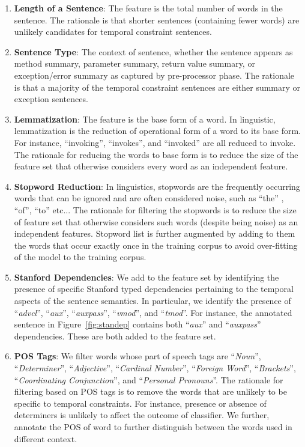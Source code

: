 \begin{enumerate}

	\item \textbf{Length of a Sentence}: The feature is the total number of words in  the sentence. The rationale is that shorter sentences (containing fewer words) are unlikely candidates for temporal constraint sentences. 

	\item \textbf{Sentence Type}: The context of sentence, whether the sentence appears as method summary, parameter summary, return value summary, or exception/error summary as captured by pre-processor phase. The rationale is that a majority of the temporal constraint sentences are either summary or exception sentences. 
	
	\item \textbf{Lemmatization}: The feature is the base form of a word. In linguistic, lemmatization is the reduction of operational form of a word to its base form. For instance, ``invoking'', ``invokes'', and ``invoked'' are all reduced to invoke. The rationale for reducing the words to base form is to reduce the size of the feature set that otherwise considers every word as an independent feature.  
	
	\item \textbf{Stopword Reduction}: In linguistics, stopwords are the frequently occurring words that can be ignored and are often considered noise, such as ``the'' , ``of'', ``to'' etc... The rationale for filtering the stopwords is to reduce the size of feature set that otherwise considers such words (despite being noise) as an independent features. Stopword list is further augmented by adding to them the words that occur exactly once in the training corpus to avoid over-fitting of the model to the training corpus.  
	
	\item \textbf{Stanford Dependencies}: We add to the feature set by identifying the presence of specific Stanford typed dependencies pertaining to the temporal aspects of the sentence semantics. In particular, we identify the presence of ``\textit{advcl}'', ``\textit{aux}'', ``\textit{auxpass}'', ``\textit{vmod}'', and ``\textit{tmod}''. For instance, the annotated sentence in Figure~\ref{fig:standep} contains both ``\textit{aux}'' and ``\textit{auxpass}'' dependencies. These are both added to the feature set.
	
	\item \textbf{POS Tags}: We filter words whose part of speech tags are ``\textit{Noun}'', ``\textit{Determiner}'', ``\textit{Adjective}'', ``\textit{Cardinal Number}'', ``\textit{Foreign Word}'', ``\textit{Brackets}'', ``\textit{Coordinating Conjunction}'', and ``\textit{Personal Pronouns}''. The rationale for filtering based on POS tags is to remove the words that are unlikely to be specific to temporal constraints. For instance, presence or absence of determiners is unlikely to affect the outcome of classifier. We further, annotate the POS of word to further distinguish between the words used in different context.
	

\end{enumerate}
